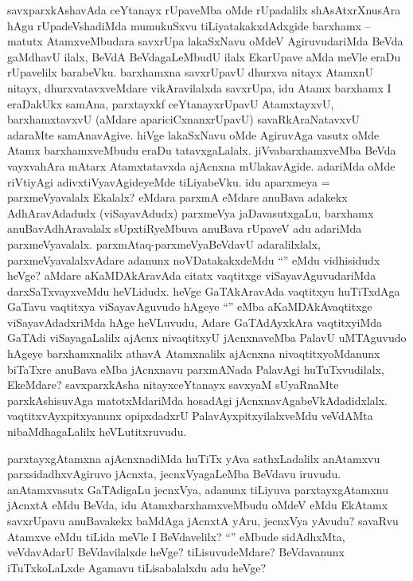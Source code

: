 \begin{artha}
  savxparxkAshavAda ceYtanayx rUpaveMba oMde rUpadalilx shAsAtxrXnusAra hAgu rUpadeVshadiMda mumukuSxvu tiLiyatakakxdAdxgide barxhamx -- matutx AtamxveMbudara savxrUpa lakaSxNavu oMdeV AgiruvudariMda BeVda gaMdhavU ilalx, BeVdA BeVdagaLeMbudU ilalx EkarUpave aMda meVle eraDu rUpavelilx barabeVku. barxhamxna savxrUpavU dhurxva nitayx AtamxnU nitayx, dhurxvatavxveMdare vikAravilalxda savxrUpa, idu Atamx barxhamx I eraDakUkx samAna, parxtayxkf ceYtanayxrUpavU AtamxtayxvU, barxhamxtavxvU (aMdare apariciCxnanxrUpavU) savaRkAraNatavxvU adaraMte samAnavAgive. hiVge lakaSxNavu oMde AgiruvAga vasutx oMde Atamx barxhamxveMbudu eraDu tatavxgaLalalx. jiVvabarxhamxveMba BeVda vayxvahAra mAtarx Atamxtatavxda ajAcnxna mUlakavAgide. adariMda oMde riVtiyAgi adivxtiVyavAgideyeMde tiLiyabeVku. idu aparxmeya = parxmeVyavalalx Ekalalx? eMdara parxmA eMdare anuBava adakekx AdhAravAdadudx (viSayavAdudx) parxmeVya jaDavasutxgaLu, barxhamx anuBavAdhAravalalx sUpxtiRyeMbuva anuBava rUpaveV adu adariMda parxmeVyavalalx. parxmAtaq-parxmeVyaBeVdavU adaralilxlalx, parxmeVyavalalxvAdare adanunx noVDatakakxdeMdu ``\stext'' eMdu vidhisidudx heVge? aMdare aKaMDAkAravAda citatx vaqtitxge viSayavAguvudariMda darxSaTxvayxveMdu heVLidudx. heVge GaTAkAravAda vaqtitxyu huTiTxdAga GaTavu vaqtitxya viSayavAguvudo hAgeye ``\stext'' eMba aKaMDAkAvaqtitxge viSayavAdadxriMda hAge heVLuvudu, Adare GaTAdAyxkAra vaqtitxyiMda GaTAdi viSayagaLalilx ajAcnx nivaqtitxyU jAcnxnaveMba PalavU uMTAguvudo hAgeye barxhamxnalilx athavA Atamxnalilx ajAcnxna nivaqtitxyoMdanunx biTaTxre anuBava eMba jAcnxnavu parxmANada PalavAgi huTuTxvudilalx, EkeMdare? savxparxkAsha nitayxceYtanayx savxyaM sUyaRnaMte parxkAshisuvAga matotxMdariMda hosadAgi jAcnxnavAgabeVkAdadidxlalx. vaqtitxvAyxpitxyanunx opipxdadxrU PalavAyxpitxyilalxveMdu veVdAMta nibaMdhagaLalilx heVLutitxruvudu.

parxtayxgAtamxna ajAcnxnadiMda huTiTx yAva sathxLadalilx anAtamxvu parxsidadhxvAgiruvo jAcnxta, jecnxVyagaLeMba BeVdavu iruvudu. anAtamxvasutx GaTAdigaLu jecnxVya, adanunx tiLiyuva parxtayxgAtamxnu jAcnxtA eMdu BeVda, idu AtamxbarxhamxveMbudu oMdeV eMdu EkAtamx savxrUpavu anuBavakekx baMdAga jAcnxtA yAru, jecnxVya yAvudu?  savaRvu Atamxve eMdu tiLida meVle I BeVdavelilx? ``\stext'' eMbude sidAdhxMta, veVdavAdarU BeVdavilalxde heVge? tiLisuvudeMdare? BeVdavanunx iTuTxkoLaLxde Agamavu tiLisabalalxdu adu heVge? 
\end{artha}


